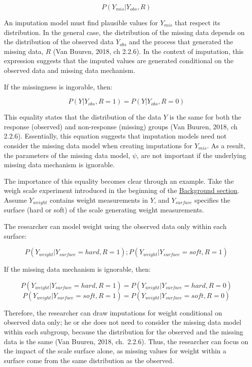 \documentclass[12pt,oneside]{chicagocapstone}
\begin{document}
\[P(Y_{mis}|Y_{obs}, R)\]

An imputation model must find plausible values for \(Y_{mis}\) that
respect its distribution. In the general case, the distribution of the
missing data depends on the distribution of the observed data
\(Y_{obs}\) and the process that generated the missing data, \(R\) (Van
Buuren, 2018, ch 2.2.6). In the context of imputation, this expression
suggests that the imputed values are generated conditional on the
observed data and missing data mechanism.

If the missingness is ingorable, then:

\[P(Y|Y_{obs}, R=1) = P(Y|Y_{obs}, R=0)\]

This equality states that the distribution of the data \(Y\) is the same
for both the response (observed) and non-response (missing) groups (Van
Buuren, 2018, ch 2.2.6). Essentially, this equation suggests that
imputation models need not consider the missing data model when creating
imputations for \(Y_{mis}\). As a result, the parameters of the missing
data model, \(\psi\), are not important if the underlying missing data
mechanism is ignorable.

The importance of this equality becomes clear through an example. Take
the weigh scale experiment introduced in the beginning of the
\protect\hyperlink{background}{Background section}. Assume
\(Y_{weight}\) contains weight measurements in \(Y\), and
\(Y_{surface}\) specifies the surface (hard or soft) of the scale
generating weight measurements.

The researcher can model weight using the observed data only within each
surface:

\[P(Y_{weight}|Y_{surface}=hard, R=1) ; P(Y_{weight}|Y_{surface}=soft, R=1)\]

If the missing data mechanism is ignorable, then:

\[P(Y_{weight}|Y_{surface}=hard, R=1) = P(Y_{weight}|Y_{surface}=hard, R=0)\]
\[P(Y_{weight}|Y_{surface}=soft, R=1) = P(Y_{weight}|Y_{surface}=soft, R=0)\]

Therefore, the researcher can draw imputations for weight conditional on
observed data only; he or she does not need to consider the missing data
model within each subgroup, because the distribution for the observed
and the missing data is the same (Van Buuren, 2018, ch.~2.2.6). Thus,
the researcher can focus on the impact of the scale surface alone, as
missing values for weight within a surface come from the same
distribution as the observed.
\end{document}

